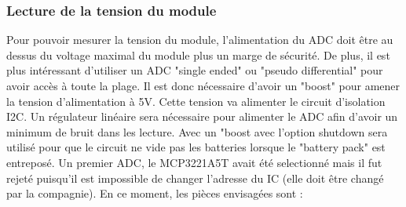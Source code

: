 \documentclass[12pt,letterpaper]{article}
\begin{document}
\begin{normalsize}
				\subsubsection{Lecture de la tension du module}
					Pour pouvoir mesurer la tension du module, l'alimentation du ADC doit \^{e}tre au dessus du voltage maximal du module plus un marge de s\'{e}curit\'{e}. De plus, il est plus int\'{e}ressant d'utiliser un ADC "single ended" ou "pseudo differential" pour avoir acc\`{e}s \`{a} toute la plage. Il est donc n\'{e}cessaire d'avoir un "boost" pour amener la tension d'alimentation \`{a} 5V. Cette tension va alimenter le circuit d'isolation I2C. Un r\'{e}gulateur lin\'{e}aire sera n\'{e}cessaire pour alimenter le ADC afin d'avoir un minimum de bruit dans les lecture. Avec un "boost avec l'option shutdown sera utilis\'{e} pour que le circuit ne vide pas les batteries lorsque le "battery pack" est entrepos\'{e}. Un premier ADC, le MCP3221A5T avait \'{e}t\'{e} selectionn\'{e} mais il fut rejet\'{e} puisqu'il est impossible de changer l'adresse du IC (elle doit \^{e}tre chang\'{e} par la compagnie). En ce moment, les pi\`{e}ces envisag\'{e}es sont : \\
					

\end{normalsize}
\end{document}
